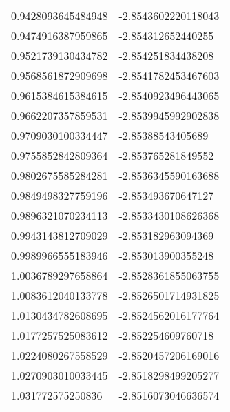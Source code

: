\begin{supertabular}{ll}
0.9428093645484948  & -2.8543602220118043  \\
0.9474916387959865  & -2.854312652440255   \\
0.9521739130434782  & -2.854251834438208   \\
0.9568561872909698  & -2.8541782453467603  \\
0.9615384615384615  & -2.8540923496443065  \\
0.9662207357859531  & -2.8539945992902838  \\
0.9709030100334447  & -2.85388543405689    \\
0.9755852842809364  & -2.853765281849552   \\
0.9802675585284281  & -2.8536345590163688  \\
0.9849498327759196  & -2.853493670647127   \\
0.9896321070234113  & -2.8533430108626368  \\
0.9943143812709029  & -2.853182963094369   \\
0.9989966555183946  & -2.853013900355248   \\
1.0036789297658864  & -2.8528361855063755  \\
1.0083612040133778  & -2.8526501714931825  \\
1.0130434782608695  & -2.8524562016177764  \\
1.0177257525083612  & -2.852254609760718   \\
1.0224080267558529  & -2.8520457206169016  \\
1.0270903010033445  & -2.8518298499205277  \\
1.031772575250836   & -2.8516073046636574  \\
\end{supertabular}
